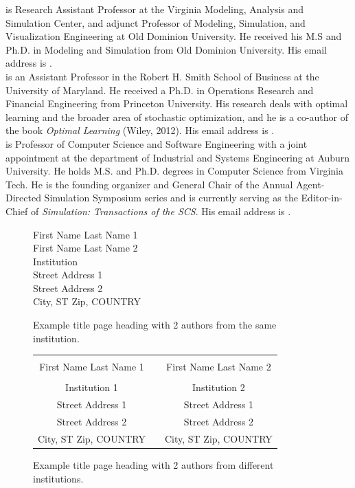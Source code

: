 \documentclass{wscpaperproc}
\theoremstyle{wsc}
\begin{document}
 is Research Assistant Professor at the Virginia Modeling, Analysis and Simulation Center, and adjunct Professor of Modeling, Simulation, and Visualization Engineering at Old Dominion University. He received his M.S and Ph.D. in Modeling and Simulation from Old Dominion University. His email address is .\\

 is an Assistant Professor in the Robert H. Smith School of Business at the University of Maryland. He received a Ph.D. in Operations Research and Financial Engineering from Princeton University. His research deals with optimal learning and the broader area of stochastic optimization, and he is a co-author of the book \textit{Optimal Learning} (Wiley, 2012). His email address is .\\

 is Professor of Computer Science and Software Engineering with a joint appointment at the department of Industrial and Systems Engineering at Auburn University. He holds M.S. and Ph.D. degrees in Computer Science from Virginia Tech. He is the founding organizer and General Chair of the Annual Agent-Directed Simulation Symposium series and is currently serving as the Editor-in-Chief of \textit{Simulation: Transactions of the SCS}. His email address is .

\newpage

\begin{figure}[htb]
{
\centering
First Name Last Name 1 \\
First Name Last Name 2 \\
\vspace{12pt}
Institution \\
Street Address 1 \\
Street Address 2 \\
City, ST Zip, COUNTRY
\caption{Example title page heading with 2 authors from the same institution.\label{fig: 2 same}}
}
\end{figure}

\begin{figure}[htb]
{
\centering
\begin{tabular}{ccc}
\phantom{Entries to adjust spacing - ignore} & \phantom{intermediate space} & \phantom{Entries to adjust spacing - ignore} \\
First Name Last Name 1 & & First Name Last Name 2 \\
\\
Institution 1 & & Institution 2 \\
Street Address 1 & & Street Address 1 \\
Street Address 2 & & Street Address 2 \\
City, ST Zip, COUNTRY & & City, ST Zip, COUNTRY
\end{tabular}
\caption{Example title page heading with 2 authors from different institutions.\label{fig: 2 different}}
}
\end{figure}
\end{document}
